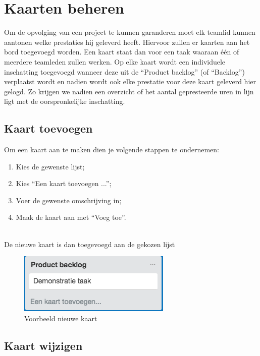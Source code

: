\chapter{Kaarten beheren}\label{chapter:kaarten_beheren}

Om de opvolging van een project te kunnen garanderen moet elk teamlid kunnen aantonen welke prestaties hij geleverd heeft. Hiervoor zullen er kaarten aan het bord toegevoegd worden. Een kaart staat dan voor een taak waaraan \'e\'en of meerdere teamleden zullen werken. Op elke kaart wordt een individuele inschatting toegevoegd wanneer deze uit de ``Product backlog'' (of ``Backlog'') verplaatst wordt en nadien wordt ook elke prestatie voor deze kaart geleverd hier gelogd. Zo krijgen we nadien een overzicht of het aantal gepresteerde uren in lijn ligt met de oorspronkelijke inschatting.

\section{Kaart toevoegen}

Om een kaart aan te maken dien je volgende stappen te ondernemen:
\begin{enumerate}[nolistsep]
	\item Kies de gewenste lijst;
	\item Kies ``Een kaart toevoegen ...'';
	\item Voer de gewenste omschrijving in;
	\item Maak de kaart aan met ``Voeg toe''.
\end{enumerate}

\noindent
\\De nieuwe kaart is dan toegevoegd aan de gekozen lijst 

\begin{figure}[h]
	\centering
	\includegraphics[scale=0.5]{./afbeeldingen/nieuwe_kaart.png}
	\caption{Voorbeeld nieuwe kaart}
	\label{fig:nieuwe_kaart}	
\end{figure} 

\section{Kaart wijzigen}

